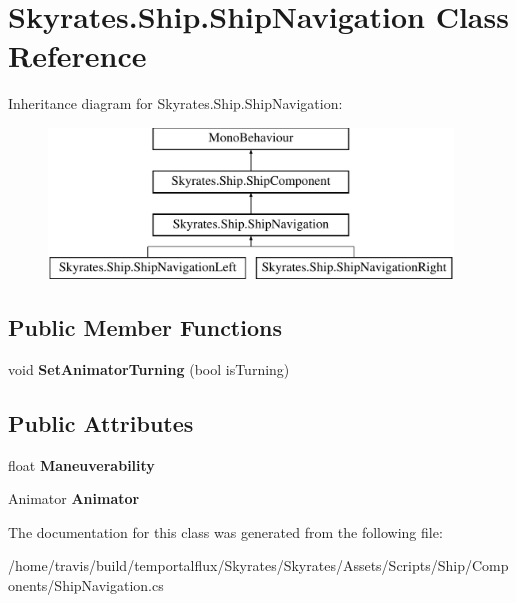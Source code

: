 \hypertarget{class_skyrates_1_1_ship_1_1_ship_navigation}{\section{Skyrates.\-Ship.\-Ship\-Navigation Class Reference}
\label{class_skyrates_1_1_ship_1_1_ship_navigation}
}
Inheritance diagram for Skyrates.\-Ship.\-Ship\-Navigation\-:\begin{figure}[H]
\begin{center}
\leavevmode
\includegraphics[height=4.000000cm]{class_skyrates_1_1_ship_1_1_ship_navigation}
\end{center}
\end{figure}
\subsection*{Public Member Functions}
\begin{DoxyCompactItemize}
\item 
\hypertarget{class_skyrates_1_1_ship_1_1_ship_navigation_aa7382c4603a78db40578e1f11c001958}{void {\bfseries Set\-Animator\-Turning} (bool is\-Turning)}\label{class_skyrates_1_1_ship_1_1_ship_navigation_aa7382c4603a78db40578e1f11c001958}

\end{DoxyCompactItemize}
\subsection*{Public Attributes}
\begin{DoxyCompactItemize}
\item 
\hypertarget{class_skyrates_1_1_ship_1_1_ship_navigation_ab9e752babbccc7e43fc3fe3943e6478d}{float {\bfseries Maneuverability}}\label{class_skyrates_1_1_ship_1_1_ship_navigation_ab9e752babbccc7e43fc3fe3943e6478d}

\item 
\hypertarget{class_skyrates_1_1_ship_1_1_ship_navigation_a054036bf58dbae0b9137190c012ce29b}{Animator {\bfseries Animator}}\label{class_skyrates_1_1_ship_1_1_ship_navigation_a054036bf58dbae0b9137190c012ce29b}

\end{DoxyCompactItemize}


The documentation for this class was generated from the following file\-:\begin{DoxyCompactItemize}
\item 
/home/travis/build/temportalflux/\-Skyrates/\-Skyrates/\-Assets/\-Scripts/\-Ship/\-Components/Ship\-Navigation.\-cs\end{DoxyCompactItemize}
